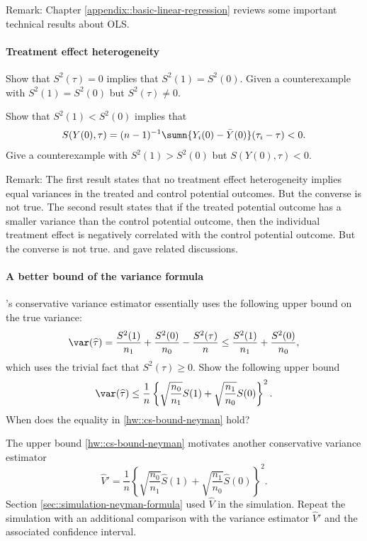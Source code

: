 Remark: Chapter \ref{appendix::basic-linear-regression} reviews some important technical results about OLS.
 
 



\paragraph{Treatment effect heterogeneity}\label{hw::treatment-effect-heterogeneity-neyman}


Show that $S^2(\tau) = 0$ implies that $S^2(1) = S^2(0)$. Given a counterexample with $S^2(1) = S^2(0)$ but $S^2(\tau) \neq  0$. 


Show that $S^2(1) < S^2(0)$ implies that 
$$
S(Y(0),\tau)  = (n-1)^{-1} \sumn \{ Y_i(0)  - \bar{Y}(0) \} (\tau_i - \tau) <0.
$$
Give a counterexample with $S^2(1) > S^2(0)$ but $S(Y(0),\tau)  < 0 .$



Remark: The first result states that no treatment effect heterogeneity implies equal variances in the treated and control potential outcomes. But the converse is not true. The second result states that if the treated potential outcome has a smaller variance than the control potential outcome, then the individual treatment effect is negatively correlated with the control potential outcome. But the converse is not true. \citet[][page 293]{gerber2012field} and \citet[][Appendix B.3]{ding2019decomposing} gave related discussions. 



\paragraph{A better bound of the variance formula}
\label{hw::better-bound-neyman}


\cite{Neyman:1923}'s conservative variance estimator essentially uses the following upper bound on the true variance:
$$
\var(\widehat{\tau}) = \frac{S^2(1)}{n_1} + \frac{S^2(0)}{n_0} - \frac{S^2(\tau)}{n} \leq \frac{S^2(1)}{n_1} + \frac{S^2(0)}{n_0},
$$
which uses the trivial fact that $S^2(\tau) \geq 0$. 
Show the following upper bound
\begin{eqnarray}\label{hw::cs-bound-neyman}
\var(\widehat{\tau})  \leq   \frac{1}{n} \left\{   \sqrt{  \frac{n_0}{n_1}  } S(1) +  \sqrt{  \frac{n_1}{n_0}  } S(0)   \right\}^2.
\end{eqnarray}
When does the equality in \eqref{hw::cs-bound-neyman} hold? 

The upper bound \eqref{hw::cs-bound-neyman} motivates another conservative variance estimator 
$$
\hat{V}' =  \frac{1}{n} \left\{   \sqrt{  \frac{n_0}{n_1}  } \hat S(1) +  \sqrt{  \frac{n_1}{n_0}  } \hat S(0)   \right\}^2.
$$
Section \ref{sec::simulation-neyman-formula} used $\hat{V}$ in the simulation. Repeat the simulation with an additional comparison with the variance estimator $\hat{V}' $ and the associated confidence interval. 



